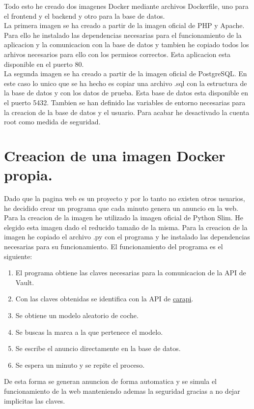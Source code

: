\documentclass{report}
\begin{document}
            Todo esto he creado dos imagenes Docker mediante archivos Dockerfile, uno para el frontend y el backend y otro para la base de datos.\\

            La primera imagen se ha creado a partir de la imagen oficial de PHP y Apache.
            Para ello he instalado las dependencias necesarias para el funcionamiento de la aplicacion y la comunicacion con la base de datos y tambien he copiado todos los arhivos necesarios para ello con los permisos correctos.
            Esta aplicacion esta disponible en el puerto 80.\\

            La segunda imagen se ha creado a partir de la imagen oficial de PostgreSQL.
            En este caso lo unico que se ha hecho es copiar una archivo .sql con la estructura de la base de datos y con los datos de prueba.
            Esta base de datos esta disponible en el puerto 5432.
            Tambien se han definido las variables de entorno necesarias para la creacion de la base de datos y el usuario.
            Para acabar he desactivado la cuenta root como medida de seguridad.\\

        \clearpage
        \section{Creacion de una imagen Docker propia.} 
            Dado que la pagina web es un proyecto y por lo tanto no existen otros usuarios, he decidido crear un programa que cada minuto genera un anuncio en la web.
            Para la creacion de la imagen he utilizado la imagen oficial de Python Slim.
            He elegido esta imagen dado el reducido tamaño de la misma.
            Para la creacion de la imagen he copiado el archivo .py con el programa y he instalado las dependencias necesarias para su funcionamiento.
            El funcionamiento del programa es el siguiente:
            \begin{enumerate}
                \item El programa obtiene las claves necesarias para la comunicacion de la API de Vault.
                \item Con las claves obtenidas se identifica con la API de \href{https://carapi.app/api#/}{carapi}.
                \item Se obtiene un modelo aleatorio de coche.
                \item Se buscas la marca a la que pertenece el modelo.
                \item Se escribe el anuncio directamente en la base de datos.
                \item Se espera un minuto y se repite el proceso.
            \end{enumerate}
            De esta forma se generan anuncion de forma automatica y se simula el funcionamiento de la web manteniendo ademas la seguridad gracias a no dejar implicitas las claves.
        \clearpage
\end{document}
